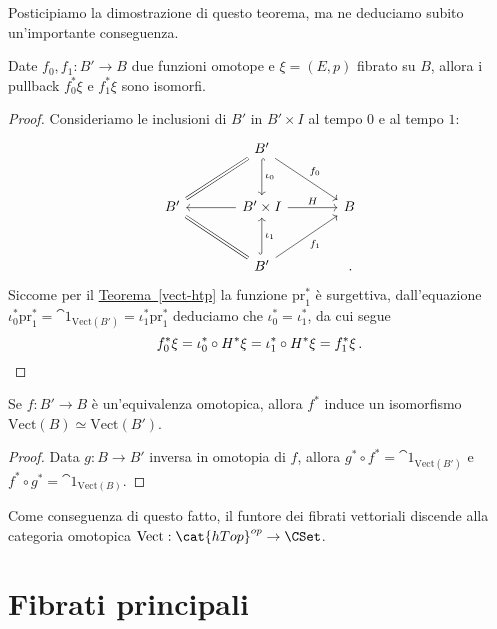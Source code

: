 Posticipiamo la dimostrazione di questo teorema,
ma ne deduciamo subito un'importante conseguenza.

\begin{cor}
	Date $f_{0},f_{1}:B' \to B$ due funzioni omotope e $\xi = (E,p)$ fibrato su $B$,
	allora i pullback $f_{0}^{*}\xi$ e $f_{1}^{*}\xi$ sono isomorfi.
	\begin{proof}
		Consideriamo le inclusioni di $B'$ in $B' \times I$ al tempo $0$ e al tempo $1$:
		\begin{equation*}
			\begin{tikzcd}[column sep=large, row sep=large]
				& B' \ar[dl, equals] \ar[dr, "f_{0}"] \ar[d, "\iota_{0}", hook] & \\
				B' 
				& B' \times I \ar[l] \ar[r, "H"]
				& B \\
				& B' \ar[ul, equals] \ar[ur, "f_{1}"'] \ar[u, "\iota_{1}"', hook] & \,.
			\end{tikzcd}
		\end{equation*}
		Siccome per il \hyperref[vect-htp]{Teorema~\ref{vect-htp}}
		la funzione $\mathrm{pr}_{1}^{*}$ è surgettiva,
		dall'equazione $\iota_{0}^{*}\mathrm{pr}_{1}^{*} = \cat{1}_{\mathrm{Vect}(B')} 
		=\iota_{1}^{*}\mathrm{pr}_{1}^{*}$ deduciamo che $\iota_{0}^{*}=\iota_{1}^{*}$,
		da cui segue
		\begin{equation*}
			f_{0}^{*}\xi = \iota_{0}^{*} \circ H^{*} \xi = \iota_{1}^{*} \circ H^{*} \xi = f_{1}^{*}\xi\,. \qedhere
		\end{equation*}
	\end{proof}
\end{cor}


\begin{cor}
	Se $f:B' \to B$ è un'equivalenza omotopica, allora $f^{*}$ 
	induce un isomorfismo $\mathrm{Vect}(B) \simeq \mathrm{Vect}(B')$.
	\begin{proof}
		Data $g:B \to B'$ inversa in omotopia di $f$, allora
		$g^{*} \circ f^{*} = \cat{1}_{\mathrm{Vect}(B')}$ e $f^* \circ g^{*} = \cat{1}_{\mathrm{Vect}(B)}$.
	\end{proof}
\end{cor}

Come conseguenza di questo fatto, il funtore dei fibrati vettoriali
discende alla categoria omotopica $\mathrm{Vect}:\cat{hTop}^{op} \to \CSet$.

\section{Fibrati principali}

